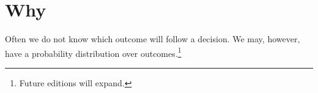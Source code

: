 

\section*{Why}

Often we do not know which outcome will follow a decision.
We may, however, have a probability distribution over outcomes.\footnote{Future editions will expand.}

\blankpage